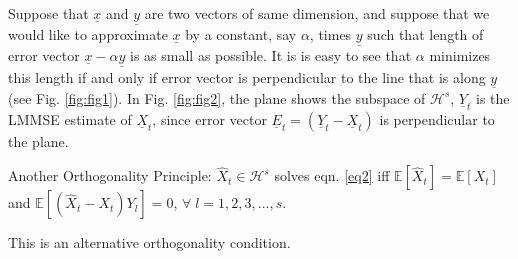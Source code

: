 \documentclass[a4paper,english,12pt]{article}
\begin{document}
\pagebreak
Suppose that $\underline{x}$ and $\underline{y}$ are two vectors of same dimension, and suppose that we would like to approximate $\underline{x}$ by a constant, say $\alpha$, times $\underline{y}$ such that length of error vector $\underline{x}-\alpha\underline{y}$ is as small as possible. It is is easy to see that $\alpha$ minimizes this length if and only if error vector is perpendicular to the line that is along $\underline{y}$ (see Fig. \ref{fig:fig1}).
In Fig. \ref{fig:fig2}, the plane shows the subspace of $\mathcal{H}^s$, $\underline{Y}_t$ is the LMMSE estimate of $\underline{X}_t$, since error vector $\underline{E}_t=(\underline{Y}_t-\underline{X}_t)$ is perpendicular to the plane. 
\begin{thm}\label{thm:thm2}
Another Orthogonality Principle:
$ \hat{X}_t \in \mathcal{H}^s $ solves eqn. \eqref{eq2} iff $
 \mathbb{E}[\hat{X}_{t}]=\mathbb{E}[X_{t}]$  and 
 $\mathbb{E}[(\hat{X}_{t}-X_t)Y_l]=0$, $\forall \; l=1,2,3,...,s$.
\end{thm}
\begin{flushleft}
This is an alternative orthogonality condition.
\end{flushleft}
\end{document}
